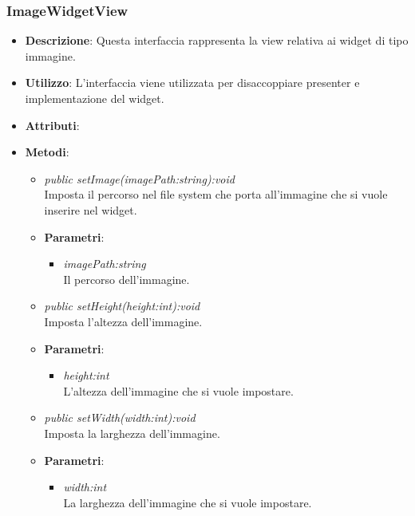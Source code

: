 \subsubsection{ImageWidgetView}
\begin{itemize}
\item \textbf{Descrizione}: Questa interfaccia rappresenta la view relativa ai widget di tipo immagine.
\item \textbf{Utilizzo}: L'interfaccia viene utilizzata per disaccoppiare presenter e implementazione del widget.
\item \textbf{Attributi}:
\item \textbf{Metodi}:
	\begin{itemize}
	\item \textit{public setImage(imagePath:string):void}\\
	Imposta il percorso nel file system che porta all'immagine che si vuole inserire nel widget.
		\item{\textbf{Parametri}: \begin{itemize}
		\item \textit{imagePath:string}\\
		Il percorso dell'immagine.
		\end{itemize}}
	\item \textit{public setHeight(height:int):void}\\
	Imposta l'altezza dell'immagine.
		\item{\textbf{Parametri}: \begin{itemize}
		\item \textit{height:int}\\
		L'altezza dell'immagine che si vuole impostare.
		\end{itemize}}
	\item \textit{public setWidth(width:int):void}\\
	Imposta la larghezza dell'immagine.
		\item{\textbf{Parametri}: \begin{itemize}
		\item \textit{width:int}\\
		La larghezza dell'immagine che si vuole impostare.
		\end{itemize}}
	\end{itemize}
\end{itemize}

